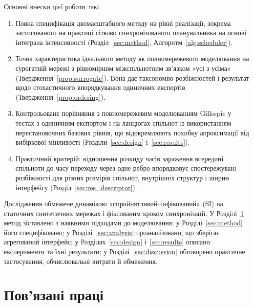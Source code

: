 Основні внески цієї роботи такі.
\begin{enumerate}
\item Повна специфікація двомасштабного методу на рівні реалізації, зокрема застосованого на практиці сітково синхронізованого планувальника на основі інтеграла інтенсивності (Розділ~\ref{sec:method}, Алгоритм~\ref{alg:scheduler}).
\item Точна характеристика ідеального методу як повномережевого моделювання на сурогатній мережі з рівномірним міжспільнотним зв'язком «усі з усіма» (Твердження~\ref{prop:surrogate}). Вона дає таксономію розбіжностей і результат щодо стохастичного впорядкування одиничних експортів (Твердження~\ref{prop:ordering}).
\item Контрольоване порівняння з повномережевим моделюванням Gillespie у тестах з одиничним експортом і на ланцюгах спільнот із використанням перестановочних базових рівнів, що відокремлюють похибку апроксимації від вибіркової мінливості (Розділи~\ref{sec:design} і~\ref{sec:results}).
\item Практичний критерій: відношення розкиду часів зараження всередині спільноти до часу переходу через одне ребро впорядковує спостережувані розбіжності для різних розмірів спільнот, внутрішніх структур і ширин інтерфейсу (Розділ~\ref{sec:res_descriptor}).
\end{enumerate}

Дослідження обмежене динамікою «сприйнятливий--інфікований» (SI) на статичних синтетичних мережах і фіксованим кроком синхронізації. У Розділі~\ref{sec:related} метод зіставлено з наявними підходами до моделювання; у Розділі~\ref{sec:method} його специфіковано; у Розділі~\ref{sec:analysis} проаналізовано, що зберігає агрегований інтерфейс; у Розділах~\ref{sec:design} і~\ref{sec:results} описано експерименти та їхні результати; у Розділі~\ref{sec:discussion} обговорено практичне застосування, обчислювальні витрати й обмеження.

\clearpage
\section{Пов'язані праці}
\label{sec:related}

